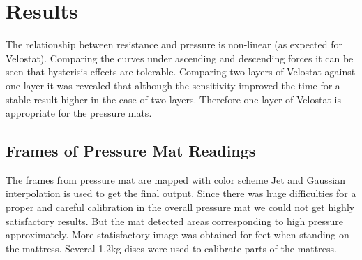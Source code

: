 \chapter{Results}
\label{chapter:results}

% 


% 
 



% 



% 




The relationship between resistance and pressure is non-linear (as expected for Velostat). Comparing the curves under ascending and descending forces it can be seen that hysterisis effects are tolerable. Comparing two layers of Velostat against one layer it was revealed that although the sensitivity improved the time for a stable result higher in the case of two layers. Therefore one layer of Velostat is appropriate for the pressure mats. 

\section{Frames of Pressure Mat Readings}
The frames from pressure mat are mapped with color scheme Jet and Gaussian interpolation is used to get the final output. Since there was huge difficulties for a proper and careful calibration in the overall pressure mat we could not get highly satisfactory results. But the mat detected areas corresponding to high pressure approximately. More statisfactory image was obtained for feet when standing on the mattress. Several 1.2kg discs were used to calibrate parts of the mattress. 


